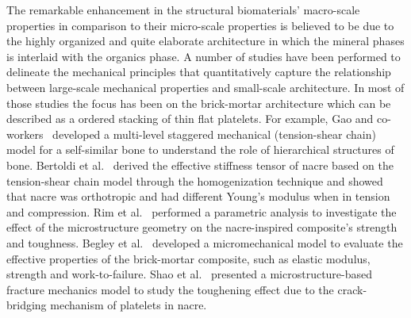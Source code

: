 \documentclass[preprint,10pt,times]{elsarticle}
\numberwithin{equation}{section}
\renewcommand{\>}{$\Rightarrow$}
\begin{document}
The remarkable enhancement in the structural biomaterials' macro-scale properties in comparison to their micro-scale properties is believed to be due to the highly organized and quite elaborate architecture in which the mineral phases is interlaid with the organics phase.
A number of studies have been performed to delineate the mechanical principles that quantitatively capture the relationship between large-scale mechanical properties and small-scale architecture.
%
In most of those studies the focus has been on the brick-mortar architecture which can be described as a ordered stacking of thin flat platelets.
%
For example, Gao and co-workers~\cite{gao2006application, ji2010mechanical} developed a multi-level staggered mechanical (tension-shear chain) model for a self-similar bone to understand the role of hierarchical structures of bone.
%
Bertoldi et al.~\cite{bertoldi2008nacre} derived the effective stiffness tensor of nacre based on the tension-shear chain model through the homogenization technique and showed that nacre was orthotropic and had different Young's modulus when in tension and compression.
%
Rim et al.~\cite{rim2011dimensional} performed a parametric analysis to investigate the effect of the microstructure geometry on the nacre-inspired composite's strength and toughness.
%
Begley et al.~\cite{begley2012micromechanical} developed a micromechanical model to evaluate the effective properties of the brick-mortar composite, such as elastic modulus, strength and work-to-failure.
%
Shao et al.~\cite{shao2012discontinuous} presented a microstructure-based fracture mechanics model to study the toughening effect due to the crack-bridging mechanism of platelets in nacre.
%
\end{document}
